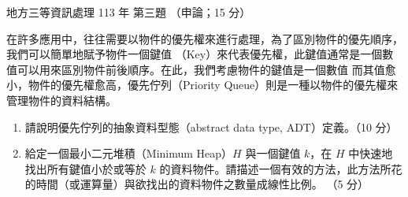 \begin{pastexam}[label={px:df3-113-ds-03}]{地方三等資訊處理 113 年 第三題}
（申論；15 分）

在許多應用中，往往需要以物件的優先權來進行處理，為了區別物件的優先順序，我們可以簡單地賦予物件一個鍵值
（Key）來代表優先權，此鍵值通常是一個數值可以用來區別物件前後順序。在此，我們考慮物件的鍵值是一個數值
而其值愈小，物件的優先權愈高，優先佇列（Priority Queue）則是一種以物件的優先權來管理物件的資料結構。
\begin{enumerate}[leftmargin=2.6em, labelsep=0.4em]
\item[㈠] 請說明優先佇列的抽象資料型態（abstract data type, ADT）定義。（10 分）
\item[㈡] 給定一個最小二元堆積（Minimum Heap）$H$ 與一個鍵值 $k$，在 $H$ 中快速地找出所有鍵值小於或等於
$k$ 的資料物件。請描述一個有效的方法，此方法所花的時間（或運算量）與欲找出的資料物件之數量成線性比例。
（5 分）
\end{enumerate}
\end{pastexam}

